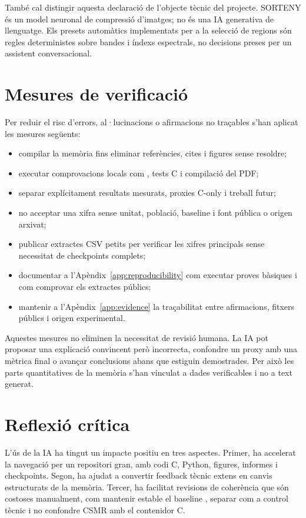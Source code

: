 També cal distingir aquesta declaració de l'objecte tècnic del projecte.
SORTENY és un model neuronal de compressió d'imatges; no és una IA generativa de
llenguatge. Els presets automàtics implementats per a la selecció de regions són
regles deterministes sobre bandes i índexs espectrals, no decisions preses per
un assistent conversacional.

\section{Mesures de verificació}

Per reduir el risc d'errors, al·lucinacions o afirmacions no traçables s'han
aplicat les mesures següents:

\begin{itemize}[leftmargin=*]
  \item compilar la memòria fins eliminar referències, cites i figures sense
  resoldre;
  \item executar comprovacions locals com , tests C i
  compilació del PDF;
  \item separar explícitament resultats mesurats, proxies C-only i treball
  futur;
  \item no acceptar una xifra sense unitat, població, baseline i font pública o
  origen arxivat;
  \item publicar extractes CSV petits per verificar les xifres principals sense
  necessitat de checkpoints complets;
  \item documentar a l'Apèndix~\ref{app:reproducibility} com executar proves
  bàsiques i com comprovar els extractes públics;
  \item mantenir a l'Apèndix~\ref{app:evidence} la traçabilitat entre
  afirmacions, fitxers públics i origen experimental.
\end{itemize}

Aquestes mesures no eliminen la necessitat de revisió humana. La IA pot
proposar una explicació convincent però incorrecta, confondre un proxy amb una
mètrica final o avançar conclusions abans que estiguin demostrades. Per això
les parts quantitatives de la memòria s'han vinculat a dades verificables i no
a text generat.

\section{Reflexió crítica}

L'ús de la IA ha tingut un impacte positiu en tres aspectes. Primer, ha accelerat
la navegació per un repositori gran, amb codi C, Python, figures, informes i
checkpoints. Segon, ha ajudat a convertir feedback tècnic extens en canvis
estructurats de la memòria. Tercer, ha facilitat revisions de coherència que són
costoses manualment, com mantenir estable el baseline , separar
 com a control tècnic i no confondre CSMR amb el contenidor C.

